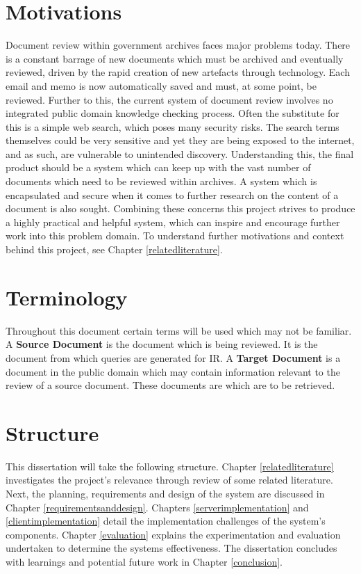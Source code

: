 \documentclass{l4proj}
\begin{document}
\section{Motivations}
Document review within government archives faces major problems today. There is a constant barrage of new documents which must be archived and eventually reviewed, driven by the rapid creation of new artefacts through technology. Each email and memo is now automatically saved and must, at some point, be reviewed.
Further to this, the current system of document review involves no integrated public domain knowledge checking process. Often the substitute for this is a simple web search, which poses many security risks. The search terms themselves could be very sensitive and yet they are being exposed to the internet, and as such, are vulnerable to unintended discovery.
Understanding this, the final product should be a system which can keep up with the vast number of documents which need to be reviewed within archives. A system which is encapsulated and secure when it comes to further research on the content of a document is also sought.
Combining these concerns this project strives to produce a highly practical and helpful system, which can inspire and encourage further work into this problem domain. To understand further motivations and context behind this project, see Chapter \ref{relatedliterature}.

\section{Terminology}
Throughout this document certain terms will be used which may not be familiar.
A \textbf{Source Document} is the document which is being reviewed. It is the document from which queries are generated for IR.
A \textbf{Target Document} is a document in the public domain which may contain information relevant to the review of a source document. These documents are which are to be retrieved.

\section{Structure}
This dissertation will take the following structure.
Chapter \ref{relatedliterature} investigates the project's relevance through review of some related literature. Next, the planning, requirements and design of the system are discussed in Chapter \ref{requirementsanddesign}. Chapters \ref{serverimplementation} and \ref{clientimplementation} detail the implementation challenges of the system's components. Chapter \ref{evaluation} explains the experimentation and evaluation undertaken to determine the systems effectiveness. The dissertation concludes with learnings and potential future work in Chapter \ref{conclusion}.
\end{document}
